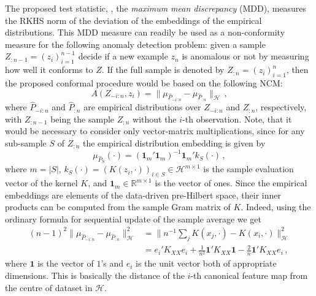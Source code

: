 \documentclass[a4paper,14pt]{extarticle}
\newcommand{\Hcal}{\mathcal{H}}
\newcommand{\Real}{\mathbb{R}}
\newcommand{\one}{\mathbf{1}}
\begin{document}
The proposed test statistic, \cite{gretton2012}, the \textit{maximum mean discrepancy}
(MDD), measures the RKHS norm of the deviation of the embeddings of the empirical
distributions. This MDD measure can readily be used as a non-conformity measure
for the following anomaly detection problem: given a sample $Z_{:n-1} = (z_i)_{i=1}^{n-1}$
decide if a new example $z_n$ is anomalous or not by measuring how well it conforms
to $Z$. If the full sample is denoted by $Z_{:n} = (z_i)_{i=1}^n$, then the proposed
conformal procedure would be based on the following NCM:
\begin{equation*}
  A(Z_{-i:n}, z_i) = \| \mu_{\hat{P}_{-i:n}} - \mu_{\hat{P}_{:n}} \|_{\Hcal} \,,
\end{equation*}
where $\hat{P}_{-i:n}$ and $\hat{P}_{:n}$ are empirical distributions over $Z_{-i:n}$
and $Z_{:n}$, respectively, with $Z_{:n-1}$ being the sample $Z_{:n}$ without the
$i$-th observation. Note, that it would be necessary to consider only vector-matrix
multiplications, since for any sub-sample $S$ of $Z_{:n}$ the empirical distribution
embedding is given by
\begin{equation*}
  \mu_{\hat{P}_S}(\cdot) = (\one_m'\one_m)^{-1} \one_m' k_S(\cdot) \,,
\end{equation*}
where $m = |S|$, $k_S(\cdot) = (K(z_i, \cdot))_{i\in S} \in \Hcal^{m\times 1}$ is
the sample evaluation vector of the kernel $K$, and $\one_m \in \Real^{m\times 1}$
is the vector of ones. Since the empirical embeddings are elements of the data-driven
pre-Hilbert space, their inner products can be computed from the sample Gram matrix
of $K$. Indeed, using the ordinary formula for sequential update of the sample average
we get
\begin{align*}
  (n-1)^2 \bigl\|\mu_{\hat{P}_{-i:n}} - \mu_{\hat{P}_{:n}} \bigr\|^2_\Hcal
    &= \bigl\| n^{-1} \sum_j K(x_j, \cdot) - K(x_i, \cdot) \bigr\|^2_\Hcal \\
    &= e_i'K_{XX} e_i + \frac{1}{n^2} \one' K_{XX} \one - \frac{2}{n} \one' K_{XX} e_i \,,
\end{align*}
where $\one$ is the vector of $1$'s and $e_i$ is the unit vector both of appropriate
dimensions. This is basically the distance of the $i$-th canonical feature map from
the centre of dataset in $\Hcal$.
\end{document}
